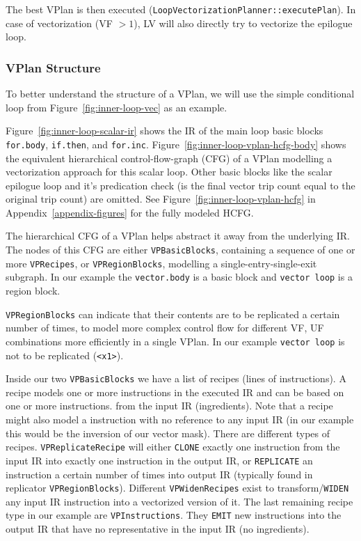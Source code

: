 \documentclass[sigplan,11pt,nonacm]{acmart}
\begin{document}
The best VPlan is then executed (\texttt{LoopVectorizationPlanner::\allowbreak executePlan}). In case of
vectorization (VF $>1$), LV will also directly try to vectorize the epilogue loop.

\subsubsection{VPlan Structure}
To better understand the structure of a VPlan, we will use the
simple conditional loop from Figure~\ref{fig:inner-loop-vec} as an example.

Figure~\ref{fig:inner-loop-scalar-ir} shows the IR of the main loop basic blocks \texttt{for.body},
\texttt{if.then}, and \texttt{for.inc}. Figure~\ref{fig:inner-loop-vplan-hcfg-body} shows the equivalent
hierarchical control-flow-graph (CFG) of a VPlan modelling a vectorization approach for this 
scalar loop. Other basic blocks like the scalar epilogue loop and it's predication check (is the final
vector trip count equal to the original trip count) are omitted. See Figure~\ref{fig:inner-loop-vplan-hcfg}
in Appendix~\ref{appendix-figures} for the fully modeled HCFG.

The hierarchical CFG of a VPlan helps abstract it away from the underlying IR. The nodes of this CFG
are either \texttt{VPBasicBlocks}, containing a sequence of one or more \texttt{VPRecipes}, or
\texttt{VPRegionBlocks}, modelling a single-entry-single-exit subgraph.
In our example the \texttt{vector.body} is a basic block and \texttt{vector loop} is a region block.

\texttt{VPRegionBlocks} can indicate that their contents are to be replicated a certain number of times,
to model more complex control flow for different VF, UF combinations more efficiently in a single VPlan. 
In our example \texttt{vector loop} is not to be replicated (\texttt{<x1>}).

Inside our two \texttt{VPBasicBlocks} we have a list of recipes (lines of instructions). A recipe
models one or more instructions in the executed IR and can be based on one or more instructions.
from the input IR (ingredients). Note that a recipe might also model a instruction with no reference to any input
IR (in our example this would be the inversion of our vector mask). There are different types of 
recipes. \texttt{VPReplicateRecipe} will either \texttt{CLONE} exactly one instruction from the input IR
into exactly one instruction in the output IR, or \texttt{REPLICATE} an instruction a certain number
of times into output IR (typically found in replicator \texttt{VPRegionBlocks}). Different 
\texttt{VPWidenRecipes} exist to transform/\texttt{WIDEN} any input IR instruction into a vectorized 
version of it. The last remaining recipe type in our example are \texttt{VPInstructions}. They
\texttt{EMIT} new instructions into the output IR that have no representative in the input IR (no
ingredients).
\end{document}
